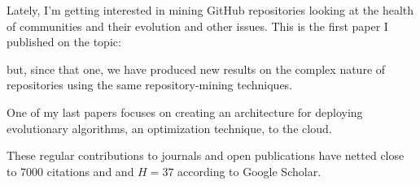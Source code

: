 \documentclass[]{friggeri-jj-cv}
\begin{document}
\cite{2014arXiv1403.3084G}

Lately, I'm getting interested in mining GitHub repositories looking
at the health of communities and their evolution and other
issues. This is the first paper I published on the topic:

\cite{2016arXiv160107862M}

but, since that one, we have produced new results on the complex
nature of repositories using the same repository-mining techniques.

One of my last papers focuses on creating an architecture for
deploying evolutionary algorithms, an optimization technique, to the
cloud.

\cite{GARCIAVALDEZ2021234}

These regular contributions to journals and open publications have
netted close to 7000 citations and and $H=37$ according to Google Scholar.

\end{document}
